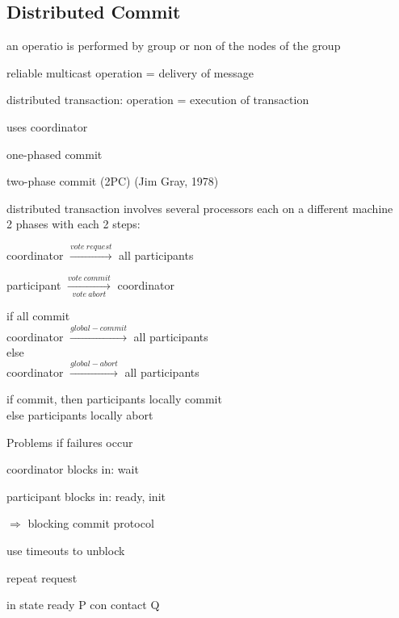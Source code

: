 \subsection{Distributed Commit}
\begin{compactitem}
	\item an operatio is performed by group or non of the nodes of the group
	\item reliable multicast operation = delivery of message
	\item distributed transaction: operation = execution of transaction
	\item uses coordinator
	\item one-phased commit\\
	\item two-phase commit (2PC) (Jim Gray, 1978)
	\begin{compactitem}
	\item distributed transaction involves several processors each on a different machine\\
	2 phases with each 2 steps:\\
	\begin{compactenum}
		\item coordinator $\xrightarrow{vote\ request}$ all participants
		\item participant $\xrightarrow[vote\ abort]{vote\ commit}$ coordinator
		\item if all commit\\
		coordinator $\xrightarrow{global-commit}$ all participants\\
		else\\
		coordinator $\xrightarrow{global-abort}$ all participants\\
		\item if commit, then participants locally commit\\
		else participants locally abort
	\end{compactenum}
	Problems if failures occur\\
	\begin{compactitem}
		\item coordinator blocks in: wait
		\item participant blocks in: ready, init
	\end{compactitem}
	$\Rightarrow$ blocking commit protocol
	\item use timeouts to unblock
	\item repeat request
	\item in state ready P con contact Q\\

\end{compactitem}
\end{compactitem}
